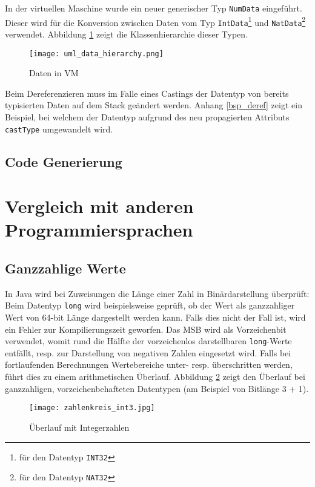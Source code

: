 \documentclass[10pt, a4paper, twocolumn]{article} %
\begin{document}
In der virtuellen Maschine wurde ein neuer generischer Typ \texttt{NumData} eingeführt.
Dieser wird für die Konversion zwischen Daten vom Typ \texttt{IntData}\footnote{für den Datentyp \texttt{INT32}} und \texttt{NatData}\footnote{für den Datentyp \texttt{NAT32}} verwendet.
Abbildung \ref{data_hierarchy} zeigt die Klassenhierarchie dieser Typen.

\begin{figure}[H]
    \texttt{[image: uml\_data\_hierarchy.png]} %
    \caption{Daten in VM} %
    \label{data_hierarchy}
\end{figure}

Beim Dereferenzieren muss im Falle eines Castings der Datentyp von bereits typisierten Daten auf dem Stack geändert werden.
Anhang \ref{bsp_deref} zeigt ein Beispiel, bei welchem der Datentyp aufgrund des neu propagierten Attributs \texttt{castType} umgewandelt wird.

\subsection{Code Generierung}
\section{Vergleich mit anderen Programmiersprachen}
\subsection{Ganzzahlige Werte}
In Java wird bei Zuweisungen die Länge einer Zahl in Binärdarstellung überprüft:
Beim Datentyp \texttt{long} wird beispielsweise geprüft, ob der Wert als ganzzahliger Wert von 64-bit Länge dargestellt werden kann.
Falls dies nicht der Fall ist, wird ein Fehler zur Kompilierungszeit geworfen.
Das MSB wird als Vorzeichenbit verwendet, womit rund die Hälfte der vorzeichenlos darstellbaren \texttt{long}-Werte entfällt, resp. zur Darstellung von negativen Zahlen eingesetzt wird.
Falls bei fortlaufenden Berechnungen Wertebereiche unter- resp. überschritten werden, führt dies zu einem arithmetischen Überlauf.
Abbildung \ref{zahlenkreis}
zeigt den Überlauf bei ganzzahligen, vorzeichenbehafteten Datentypen (am Beispiel von Bitlänge 3 + 1).

\begin{figure}[H]
    \texttt{[image: zahlenkreis\_int3.jpg]}
    \caption{Überlauf mit Integerzahlen}
    \label{zahlenkreis}
\end{figure}
\end{document}
